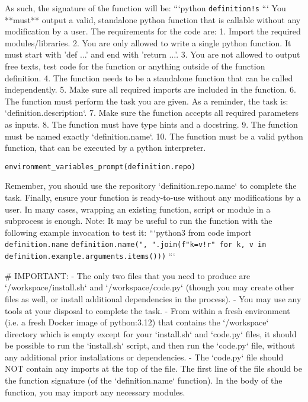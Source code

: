\begin{tcolorbox}[title={\texttt{OpenHands Instructions}}]
As such, the signature of the function will be:
```python
\texttt{{definition!s}}
```
You **must** output a valid, standalone python function that is callable without any modification by a user.
The requirements for the code are:
1. Import the required modules/libraries.
2. You are only allowed to write a single python function. It must start with 'def ...' and end with 'return ...'.
3. You are not allowed to output free texts, test code for the function or anything outside of the function definition.
4. The function needs to be a standalone function that can be called independently.
5. Make sure all required imports are included in the function.
6. The function must perform the task you are given. As a reminder, the task is: `{definition.description}`.
7. Make sure the function accepts all required parameters as inputs.
8. The function must have type hints and a docstring.
9. The function must be named exactly `{definition.name}`.
10. The function must be a valid python function, that can be executed by a python interpreter.

\texttt{{environment\_variables\_prompt(definition.repo)}}

Remember, you should use the repository `{definition.repo.name}` to complete the task.
Finally, ensure your function is ready-to-use without any modifications by a user. In many cases, wrapping an existing function, script or module in a subprocess is enough.
Note: It may be useful to run the function with the following example invocation to test it:
```python3
from code import \texttt{{definition.name}}
\texttt{{definition.name}({", ".join(f"{k}={v!r}" for k, v in definition.example.arguments.items())})}
```

\# IMPORTANT:
- The only two files that you need to produce are `/workspace/install.sh` and `/workspace/code.py` (though you may create other files as well, or install additional dependencies in the process).
- You may use any tools at your disposal to complete the task.
- From within a fresh environment (i.e. a fresh Docker image of python:3.12) that contains the `/workspace` directory which is empty except for your `install.sh` and `code.py` files, it should be possible to run the `install.sh` script, and then run the `code.py` file, without any additional prior installations or dependencies.
- The `code.py` file should NOT contain any imports at the top of the file. The first line of the file should be the function signature (of the `{definition.name}` function). In the body of the function, you may import any necessary modules.
\end{tcolorbox}
